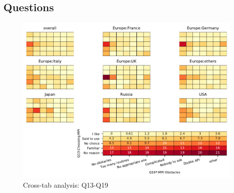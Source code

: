 
\subsection{Questions}


\begin{figure}
\begin{center}
\includegraphics[width=12cm]{../pdfs/Q13-Q19.pdf}
\caption{Cross-tab analysis: Q13-Q19}
\label{fig:Q13-Q19}
\end{center}
\end{figure}
